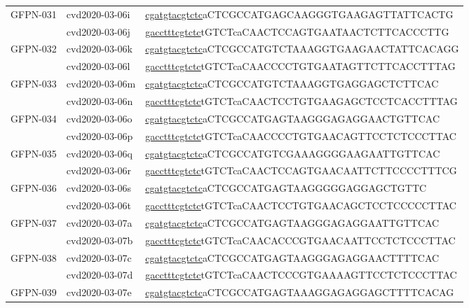 \begin{landscape}
\begin{longtable}{|l|l|l|}
		\multirow{2}{*}{GFPN-031} & cvd2020-03-06i & \underline{cgatgta\underline{cgtctc}}aCTCGCCATGAGCAAGGGTGAAGAGTTATTCACTG   \\ \cline{2-3} 
		& cvd2020-03-06j & \underline{gaccttt\underline{cgtctc}}tGTCTcaCAACTCCAGTGAATAACTCTTCACCCTTG  \\ \hline
		\multirow{2}{*}{GFPN-032} & cvd2020-03-06k & \underline{cgatgta\underline{cgtctc}}aCTCGCCATGTCTAAAGGTGAAGAACTATTCACAGG  \\ \cline{2-3} 
		& cvd2020-03-06l & \underline{gaccttt\underline{cgtctc}}tGTCTcaCAACCCCTGTGAATAGTTCTTCACCTTTAG \\ \hline
		\multirow{2}{*}{GFPN-033} & cvd2020-03-06m & \underline{cgatgta\underline{cgtctc}}aCTCGCCATGTCTAAAGGTGAGGAGCTCTTCAC     \\ \cline{2-3} 
		& cvd2020-03-06n & \underline{gaccttt\underline{cgtctc}}tGTCTcaCAACTCCTGTGAAGAGCTCCTCACCTTTAG \\ \hline
		\multirow{2}{*}{GFPN-034} & cvd2020-03-06o & \underline{cgatgta\underline{cgtctc}}aCTCGCCATGAGTAAGGGAGAGGAACTGTTCAC     \\ \cline{2-3} 
		& cvd2020-03-06p & \underline{gaccttt\underline{cgtctc}}tGTCTcaCAACCCCTGTGAACAGTTCCTCTCCCTTAC \\ \hline
		\multirow{2}{*}{GFPN-035} & cvd2020-03-06q & \underline{cgatgta\underline{cgtctc}}aCTCGCCATGTCGAAAGGGGAAGAATTGTTCAC     \\ \cline{2-3} 
		& cvd2020-03-06r & \underline{gaccttt\underline{cgtctc}}tGTCTcaCAACTCCAGTGAACAATTCTTCCCCTTTCG \\ \hline
		\multirow{2}{*}{GFPN-036} & cvd2020-03-06s & \underline{cgatgta\underline{cgtctc}}aCTCGCCATGAGTAAGGGGGAGGAGCTGTTC       \\ \cline{2-3} 
		& cvd2020-03-06t & \underline{gaccttt\underline{cgtctc}}tGTCTcaCAACTCCTGTGAACAGCTCCTCCCCCTTAC \\ \hline
		\multirow{2}{*}{GFPN-037} & cvd2020-03-07a & \underline{cgatgta\underline{cgtctc}}aCTCGCCATGAGTAAGGGAGAGGAATTGTTCAC     \\ \cline{2-3} 
		& cvd2020-03-07b & \underline{gaccttt\underline{cgtctc}}tGTCTcaCAACACCCGTGAACAATTCCTCTCCCTTAC \\ \hline
		\multirow{2}{*}{GFPN-038} & cvd2020-03-07c & \underline{cgatgta\underline{cgtctc}}aCTCGCCATGAGTAAGGGAGAGGAACTTTTCAC     \\ \cline{2-3} 
		& cvd2020-03-07d & \underline{gaccttt\underline{cgtctc}}tGTCTcaCAACTCCCGTGAAAAGTTCCTCTCCCTTAC \\ \hline
		\multirow{2}{*}{GFPN-039} & cvd2020-03-07e & \underline{cgatgta\underline{cgtctc}}aCTCGCCATGAGTAAAGGAGAGGAGCTTTTCACAG   \\ \cline{2-3} 

\end{longtable}
\end{landscape}
